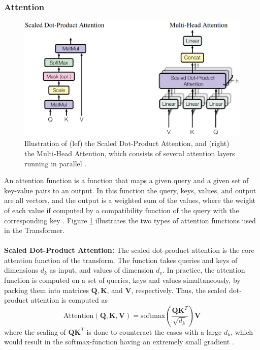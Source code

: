 \documentclass[./main.tex]{subfiles}
\begin{document}
\subsubsection{Attention}
\begin{figure}[htbp]
    \centering
    \includegraphics[width = 0.5 \textwidth]{./entities/attention.PNG}
    \caption{Illustration of (lef) the Scaled Dot-Product Attention, and (right) the Multi-Head Attention, which consists of several attention layers running in parallel \cite{https://doi.org/10.48550/arxiv.1706.03762}.}
    \label{fig:attention_illustration}
\end{figure}
\noindent An attention function is a function that maps a given query and a given set of key-value pairs to an output. In this function the query, keys, values, and output are all vectors, and the output is a weighted sum of the values, where the weight of each value if computed by a compatibility function of the query with the corresponding key \cite{https://doi.org/10.48550/arxiv.1706.03762}. Figure \ref{fig:attention_illustration} illustrates the two types of attention functions used in the Transformer.
\\
\\
\textbf{Scaled Dot-Product Attention:} The scaled dot-product attention is the core attention function of the transform. The function takes queries and keys of dimensions $d_k$ as input, and values of dimension $d_v$. In practice, the attention function is computed on a set of queries, keys and values simultaneously, by packing them into matrices $\bm{Q}, \bm{K}$, and $\bm{V}$, respectively. Thus, the scaled dot-product attention is computed as
\begin{equation}
    \text{Attention}(\bm{Q}, \bm{K}, \bm{V}) = \text{softmax}\left( \frac{\bm{Q}\bm{K}^T}{\sqrt{d_k}} \right) \bm{V}
\end{equation} 
where the scaling of $\bm{Q}\bm{K}^T$ is done to counteract the cases with a large $d_k$, which would result in the softmax-function having an extremely small gradient \cite{https://doi.org/10.48550/arxiv.1706.03762}.
\\
\\
\end{document}
